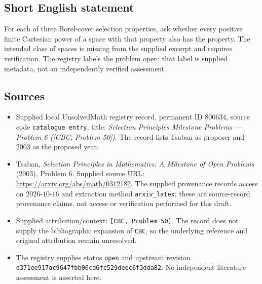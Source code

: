 \documentclass[11pt]{article}
\begin{document}
\subsection{Short English statement}
For each of three Borel-cover selection properties, ask whether every positive finite Cartesian power of a space with that property also has the property. The intended class of spaces is missing from the supplied excerpt and requires verification. The registry labels the problem open; that label is supplied metadata, not an independently verified assessment.
\subsection{Sources}
\begin{itemize}
\item Supplied local UnsolvedMath registry record, permanent ID \(800634\), source code \texttt{catalogue entry}, title: \emph{Selection Principles Milestone Problems --- Problem 6 ([CBC, Problem 50])}. The record lists Tsaban as proposer and \(2003\) as the proposed year.
\item Tsaban, \emph{Selection Principles in Mathematics: A Milestone of Open Problems} (2003), Problem 6. Supplied source URL: \url{https://arxiv.org/abs/math/0312182}. The supplied provenance records access on \(2026\text{-}10\text{-}16\) and extraction method \texttt{arxiv\_latex}; these are source-record provenance claims, not access or verification performed for this draft.
\item Supplied attribution/context: \texttt{[CBC, Problem 50]}. The record does not supply the bibliographic expansion of \texttt{CBC}, so the underlying reference and original attribution remain unresolved.
\item The registry supplies status \texttt{open} and upstream revision \texttt{d371ee917ac9647fbb06cd6fc529deec6f3dda82}. No independent literature assessment is asserted here.
\end{itemize}
\end{document}
